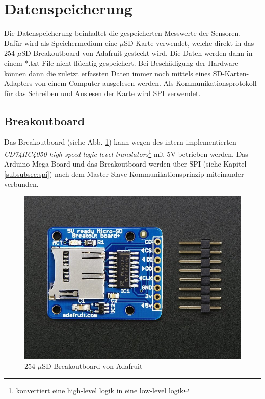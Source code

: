 \section{Datenspeicherung}
\label{chap:data}
Die Datenspeicherung beinhaltet die gespeicherten Messwerte der Sensoren. Dafür wird als Speichermedium eine $\mu$SD-Karte verwendet, welche direkt in das 254 $\mu$SD-Breakoutboard von Adafruit gesteckt wird. Die Daten werden dann in einem *.txt-File nicht flüchtig gespeichert. Bei Beschädigung der Hardware können dann die zuletzt erfassten Daten immer noch mittels eines SD-Karten-Adapters von einem Computer ausgelesen werden. Als Kommunikationsprotokoll für das Schreiben und Auslesen der Karte wird SPI verwendet.\\
\subsection{Breakoutboard}
Das Breakoutboard (siehe Abb. \ref{fig:muSDBreakout}) kann wegen des intern implementierten \textit{CD74HC4050 high-speed logic level translators}\footnote{konvertiert eine high-level logik in eine low-level logik} mit 5V betrieben werden. Das Arduino Mega Board und das Breakoutboard werden über SPI (siehe Kapitel \ref{subsubsec:spi}) nach dem Master-Slave Kommunikationsprinzip miteinander verbunden. 
\begin{figure}[h]
\centering
\includegraphics[width=0.5\linewidth]{graphics/Datenspeicherung/micro_sd_card_breakout.png}
\caption{254 $\mu$SD-Breakoutboard von Adafruit \cite{ladyada2018}}
\label{fig:muSDBreakout}
\end{figure}

